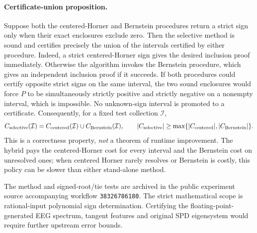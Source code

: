 \paragraph{Certificate-union proposition.}
Suppose both the centered-Horner and Bernstein
procedures return a strict sign only when their exact
enclosures exclude zero. Then the selective method
is sound and certifies precisely the union of
the intervals certified by either procedure.
Indeed, a strict centered-Horner sign gives the
desired inclusion proof immediately. Otherwise the
algorithm invokes the Bernstein procedure, which
gives an independent inclusion proof if it succeeds.
If both procedures could certify opposite strict
signs on the same interval, the two sound
enclosures would force $P$ to be simultaneously
strictly positive and strictly negative on a
nonempty interval, which is impossible. No
unknown-sign interval is promoted to a certificate.
Consequently, for a fixed test collection $\mathcal I$,
\[
C_{\rm selective}(\mathcal I)
= C_{\rm centered}(\mathcal I)
\cup C_{\rm Bernstein}(\mathcal I),\qquad
|C_{\rm selective}|\geq
\max\{|C_{\rm centered}|,|C_{\rm Bernstein}|\}.
\]
This is a correctness property, \emph{not}
a theorem of runtime improvement. The hybrid
pays the centered-Horner cost for every interval
and the Bernstein cost on unresolved ones;
when centered Horner rarely resolves or
Bernstein is costly, this policy can be slower
than either stand-alone method.

The method and signed-root/tie tests are archived
in the public experiment source accompanying
workflow \texttt{38326786180}.
The strict mathematical scope is rational-input
polynomial sign determination. Certifying the
floating-point-generated EEG spectrum, tangent
features and original SPD eigensystem would
require further upstream error bounds.
